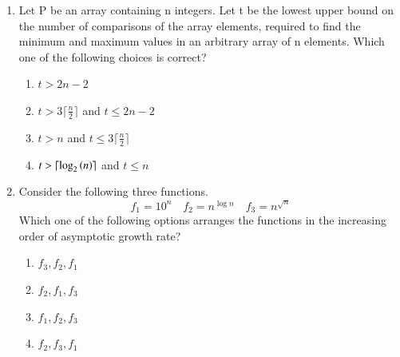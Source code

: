 \documentclass[a4paper, 11pt]{article}
\begin{document}
\begin{enumerate}
    \item Let P be an array containing n integers. Let t be the lowest upper bound on the number of comparisons of the array elements, required to find the minimum and maximum values in an arbitrary array of n elements. Which one of the following choices is correct?
    \begin{enumerate}
        \item $t > 2n-2$
        \item $t > 3 \lceil \frac{n}{2} \rceil$ and $t \le 2n-2$
        \item $t > n$ and $t \le 3 \lceil \frac{n}{2} \rceil$
        \item $t > \lceil \log_2\brak{n} \rceil$ and $t \le n$
    \end{enumerate}
    \hfill{}
    
    \item Consider the following three functions.
    \[ f_1 = 10^n \quad f_2 = n^{\log n} \quad f_3 = n^{\sqrt{n}} \]
    Which one of the following options arranges the functions in the increasing order of asymptotic growth rate?
    \begin{enumerate}
        \item $f_3, f_2, f_1$
        \item $f_2, f_1, f_3$
        \item $f_1, f_2, f_3$
        \item $f_2, f_3, f_1$
    \end{enumerate}
    \hfill{}
    

\end{enumerate}
\end{document}
